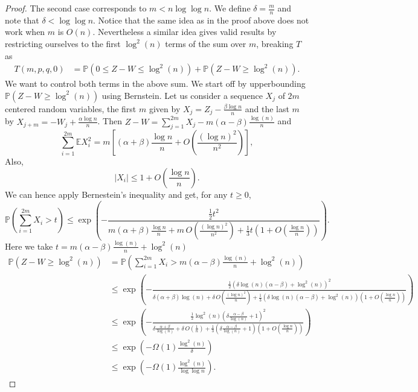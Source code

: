 \documentclass[english]{article}
\newcommand{\1}{\textbf{1}}
\newcommand{\OOO}{O}
\newcommand{\p}{\mathbb{P}}
\begin{document}
\begin{proof}
The second case corresponds to $m< n\log \log n $. We define $\delta = \frac{m}{n}$ and note that $\delta < \log \log n$. Notice that the same idea as in the proof above does not work when $m$ is $O(n)$. Nevertheless a similar idea gives valid results by restricting ourselves to the first $\log^2(n)$ terms of the sum over $m$, breaking $T$ as 
\begin{align} \label{Tdef}
T(m,p,q,0) &= \p \left(  0 \leq Z-W \leq \log^2(n) \right)+ \p \left( Z-W \geq \log^2(n) \right).
\end{align}
We want to control both terms in the above sum. We start off by upperbounding $\p \left( Z-W \geq \log^2(n) \right)$ using Bernstein. Let us consider a sequence $X_j$ of $2m$ centered random variables, 
the first $m$ given by $X_j = Z_j -\frac{\beta{\log n}}n$ and the last $m$ by $X_{j+m} = -W_j + \frac{\alpha{\log n}}n$.
Then $Z-W =\sum_{j=1}^{2m} X_j -m(\alpha -\beta) \frac{\log(n)}{n}$ and 
\[
\sum_{i=1}^{2m}\mathbb{E}X_i^2 = m\left[(\alpha+\beta)\frac{\log n}{n} + \OOO\left( \frac{(\log n)^2}{n^2} \right)\right],
\]
Also, $$\left|X_i\right| \leq 1 + \OOO\left( \frac{\log n}{n} \right).$$
We can hence apply Bernestein's inequality and get, for any $t\geq 0$,
\[
\p\left(\sum_{i=1}^{2m} X_i > t \right) \leq \exp\left( - \frac{\frac12t^2}{m(\alpha+\beta)\frac{\log n}{n} + m\,\OOO\left( \frac{(\log n)^2}{n^2} \right)+\frac13t\left(1+\OOO \left( \frac{\log n}{n} \right)\right)} \right).
\]
Here we take $t= m(\alpha-\beta) \frac{\log(n)}{n} + \log^2(n)$
\begin{align} \label{Bst1}
\p \left( Z-W \geq \log^2(n) \right) &=\p \left( \sum_{i=1}^{2m}X_i > m(\alpha-\beta) \frac{\log(n)}{n} + \log^2(n)\right) \nonumber \\
&\leq \exp\left( - \frac{\frac12 \left( \delta \log(n) (\alpha-\beta) +\log^2(n) \right)^2}{\delta(\alpha+\beta)\log(n) + \delta\,\OOO\left( \frac{(\log n)^2}{n} \right)+\frac13 \left( \delta \log(n) (\alpha-\beta) +\log^2(n) \right)\left(1+\OOO \left( \frac{\log n}{n} \right)\right)} \right) \nonumber\\
& \leq \exp\left( - \frac{\frac12 \log^2(n) \left( \delta \frac{ \alpha-\beta}{\log(n)}+ 1\right)^2}{\delta\frac{\alpha+\beta}{\log(n)} + \delta\,\OOO\left( \frac{1}{n} \right)+\frac13 \left( \delta \frac{\alpha-\beta}{\log(n)} + 1\right)\left(1+\OOO \left( \frac{\log n}{n} \right)\right)} \right) \nonumber\\
& \leq \exp \left(- \Omega (1) \frac{\log^2(n)}{\delta}\right)\nonumber\\
& \leq \exp \left(- \Omega (1) \frac{\log^2(n)}{\log \log n}\right).

\end{align}
\end{proof}
\end{document}
